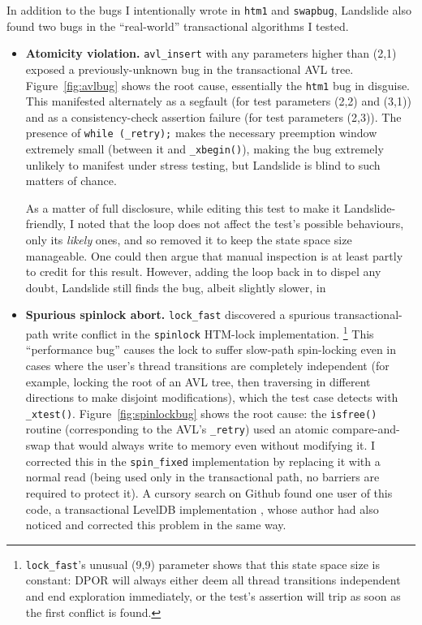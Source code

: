 In addition to the bugs I intentionally wrote in {\tt htm1} and {\tt swapbug},
Landslide also found two bugs in the ``real-world'' transactional algorithms I tested.
\begin{itemize}
	\item
	{\bf Atomicity violation.}
	{\tt avl\_insert} with any parameters higher than (2,1)
	exposed a previously-unknown bug in the transactional AVL tree.
	Figure~\ref{fig:avlbug} shows the root cause, essentially the {\tt htm1} bug in disguise.
	This manifested
	alternately
	as a segfault (for test parameters (2,2) and (3,1)) %
	and
	as a consistency-check assertion failure (for test parameters (2,3)).
	The presence of {\tt while (\_retry);} makes the necessary preemption window extremely small
	(between it and {\tt \_xbegin()}),
	making the bug extremely unlikely to manifest under stress testing,
	but Landslide is blind to such matters of chance.

	As a matter of full disclosure,
	while editing this test to make it Landslide-friendly,
	I noted that the loop does not affect the test's possible behaviours,
	only its {\em likely} ones,
	and so removed it to keep the state space size manageable.
	One could then argue that manual inspection is at least partly to credit for this result.
	However, adding the loop back in to dispel any doubt,
	Landslide still finds the bug,
	albeit slightly slower,
	in %
	\item
	{\bf Spurious spinlock abort.}
	{\tt lock\_fast} discovered a spurious transactional-path write conflict
	in the {\tt spinlock} HTM-lock implementation.%
	\footnote{{\tt lock\_fast}'s unusual (9,9) parameter shows that this state space size is constant: %
	DPOR will always either deem all thread transitions independent and end exploration immediately,
	or the test's assertion will trip as soon as the first conflict is found.}
	This ``performance bug'' causes the lock to suffer slow-path spin-locking
	even in cases where the user's thread transitions are completely independent
	(for example, locking the root of an AVL tree,
	then traversing in different directions to make disjoint modifications),
	which the test case detects with {\tt \_xtest()}.
	Figure~\ref{fig:spinlockbug} shows the root cause:
	the {\tt isfree()} routine (corresponding to the AVL's {\tt \_retry})
	used an atomic compare-and-swap that would always write to memory even without modifying it.
	I corrected this in the {\tt spin\_fixed} implementation by replacing it
	with a normal read
	(being used only in the transactional path, no barriers are required to protect it).
	A cursory search on Github found one user of this code,
	a transactional LevelDB implementation \cite{htm-leveldb-github},
	whose author had also noticed and corrected this problem in the same way.


\end{itemize}
